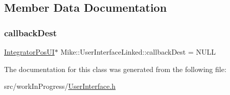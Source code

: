 \subsection{Member Data Documentation}
\mbox{\label{class_mike_1_1_user_interface_linked_aced836eb94453776afa2d07387293ea7}} 
\subsubsection{\texorpdfstring{callback\+Dest}{callbackDest}}
{\footnotesize\ttfamily \hyperlink{class_mike_1_1_user_interface_linked_aa68f3dbce9d9f381bea2f56fda8bfb6b}{Integrator\+Pos\+UI}$\ast$ Mike\+::\+User\+Interface\+Linked\+::callback\+Dest = N\+U\+LL\hspace{0.3cm}{\ttfamily [private]}}



The documentation for this class was generated from the following file\+:\begin{DoxyCompactItemize}
\item 
src/work\+In\+Progress/\hyperlink{_user_interface_8h}{User\+Interface.\+h}\end{DoxyCompactItemize}
